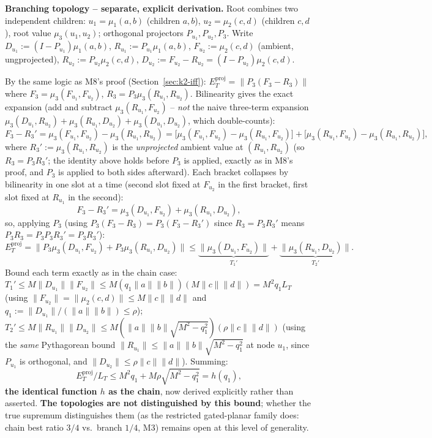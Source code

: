 \textbf{Branching topology -- separate, explicit derivation.} Root
combines two independent children: $u_1=\mu_1(a,b)$ (children $a,b$),
$u_2=\mu_2(c,d)$ (children $c,d$), root value $\mu_3(u_1,u_2)$; orthogonal
projectors $P_{u_1},P_{u_2},P_3$. Write
$D_{u_1}:=(I-P_{u_1})\mu_1(a,b)$, $R_{u_1}:=P_{u_1}\mu_1(a,b)$,
$F_{u_2}:=\mu_2(c,d)$ (ambient, ungprojected), $R_{u_2}:=P_{u_2}\mu_2(c,d)$,
$D_{u_2}:=F_{u_2}-R_{u_2}=(I-P_{u_2})\mu_2(c,d)$.

By the same logic as M8's proof (Section~\ref{sec:k2-iff}): $E_T^{
\mathrm{proj}}=\|P_3(F_3-R_3)\|$ where $F_3=\mu_3(F_{u_1},F_{u_2})$,
$R_3=P_3\mu_3(R_{u_1},R_{u_2})$. Bilinearity gives the exact expansion
(add and subtract $\mu_3(R_{u_1},F_{u_2})$ -- \emph{not} the naive
three-term expansion $\mu_3(D_{u_1},R_{u_2})+\mu_3(R_{u_1},D_{u_2})+
\mu_3(D_{u_1},D_{u_2})$, which double-counts):
\[
  F_3-R_3'
  = \mu_3(F_{u_1},F_{u_2})-\mu_3(R_{u_1},R_{u_2})
  = \big[\mu_3(F_{u_1},F_{u_2})-\mu_3(R_{u_1},F_{u_2})\big]
  + \big[\mu_3(R_{u_1},F_{u_2})-\mu_3(R_{u_1},R_{u_2})\big],
\]
where $R_3':=\mu_3(R_{u_1},R_{u_2})$ is the \emph{unprojected} ambient
value at $(R_{u_1},R_{u_2})$ (so $R_3=P_3R_3'$; the identity above holds
before $P_3$ is applied, exactly as in M8's proof, and $P_3$ is applied to
both sides afterward). Each bracket collapses by bilinearity in one slot
at a time (second slot fixed at $F_{u_2}$ in the first bracket, first
slot fixed at $R_{u_1}$ in the second):
\[
  F_3-R_3' = \mu_3(D_{u_1},F_{u_2}) + \mu_3(R_{u_1},D_{u_2}),
\]
so, applying $P_3$ (using $P_3(F_3-R_3)=P_3(F_3-R_3')$ since
$R_3=P_3R_3'$ means $P_3R_3=P_3P_3R_3'=P_3R_3'$):
\[
  E_T^{\mathrm{proj}} = \big\|P_3\mu_3(D_{u_1},F_{u_2}) + P_3\mu_3(R_{u_1},D_{u_2})\big\|
  \le \underbrace{\|\mu_3(D_{u_1},F_{u_2})\|}_{T_1'} + \underbrace{\|\mu_3(R_{u_1},D_{u_2})\|}_{T_2'}.
\]
Bound each term exactly as in the chain case: $T_1'\le M\|D_{u_1}\|\|F_{u_2}\|
\le M(q_1\|a\|\|b\|)(M\|c\|\|d\|)=M^2q_1L_T$ (using $\|F_{u_2}\|=
\|\mu_2(c,d)\|\le M\|c\|\|d\|$ and $q_1:=\|D_{u_1}\|/(\|a\|\|b\|)\le\rho$);
$T_2'\le M\|R_{u_1}\|\|D_{u_2}\|\le M(\|a\|\|b\|\sqrt{M^2-q_1^2})(\rho\|c\|\|d\|)$
(using the \emph{same} Pythagorean bound $\|R_{u_1}\|\le\|a\|\|b\|
\sqrt{M^2-q_1^2}$ at node $u_1$, since $P_{u_1}$ is orthogonal, and
$\|D_{u_2}\|\le\rho\|c\|\|d\|$). Summing:
\[
  E_T^{\mathrm{proj}}/L_T \le M^2q_1 + M\rho\sqrt{M^2-q_1^2} = h(q_1),
\]
\textbf{the identical function $h$ as the chain}, now derived explicitly
rather than asserted. \textbf{The topologies are not distinguished by
this bound}; whether the true supremum distinguishes them (as the
restricted gated-planar family does: chain best ratio $3/4$ vs.\ branch
$1/4$, M3) remains open at this level of generality.

